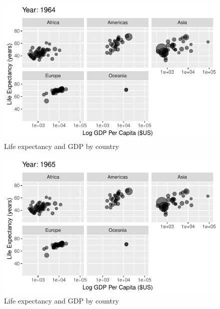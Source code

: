 \documentclass[
  letterpaper,
  DIV=11,
  numbers=noendperiod]{scrreport}
\theoremstyle{definition}
\theoremstyle{remark}
\begin{document}
\begin{figure}

{\centering \includegraphics{index_files/figure-pdf/fig-anim-lifegdp-23.pdf}

}

\caption{\label{fig-anim-lifegdp-23}Life expectancy and GDP by country}

\end{figure}

\begin{figure}

{\centering \includegraphics{index_files/figure-pdf/fig-anim-lifegdp-24.pdf}

}

\caption{\label{fig-anim-lifegdp-24}Life expectancy and GDP by country}

\end{figure}
\end{document}
